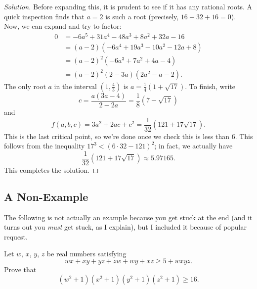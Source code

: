 \documentclass[11pt]{scrartcl}
\begin{document}
\begin{proof}[Solution]
Before expanding this,
it is prudent to see if it has any rational roots.
A quick inspection finds that $a=2$ is such a root
(precisely, $16-32+16=0$).
Now, we can expand and try to factor:
\begin{align*}
  0 &= -6a^5 + 31a^4 - 48a^3 + 8a^2 + 32a - 16 \\
  &= (a-2)(-6a^4 + 19a^3 - 10a^2 - 12a + 8) \\
  &= (a-2)^2 \left( -6a^3+7a^2+4a-4 \right) \\
  &= (a-2)^2 (2-3a)(2a^2-a-2).
\end{align*}
The only root $a$ in the interval $\left( 1,\tfrac43 \right)$
is $a = \frac 14 \left( 1 + \sqrt{17} \right)$.
To finish, write
\[ c = \frac{a(3a-4)}{2-2a}
  = \frac{1}{8} \left( 7 - \sqrt{17} \right) \]
and
\[ f(a,b,c) = 3a^2+2ac+c^2
  = \frac{1}{32} \left( 121 + 17\sqrt{17} \right). \]
This is the last critical point, so we're done once we check this is less than $6$.
This follows from the inequality $17^3 < (6 \cdot 32 - 121)^2$;
in fact, we actually have
\[ \frac{1}{32} \left( 121 + 17\sqrt{17} \right)
  \approx 5.97165. \]
This completes the solution.
\end{proof}


\subsection{A Non-Example}
The following is not actually an example because you get stuck at the end
(and it turns out you \emph{must} get stuck, as I explain),
but I included it because of popular request.
\begin{example}
  [USAMO 2014/1] Let $w$, $x$, $y$, $z$ be real numbers satisfying
  \[ wx+xy+yz+zw+wy+xz \ge 5 + wxyz. \]
  Prove that
  \[ (w^2+1)(x^2+1)(y^2+1)(z^2+1) \ge 16. \]
\end{example}
\end{document}
